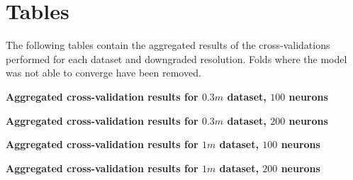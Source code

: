 
\chapter{Tables} 

\label{Tables}

The following tables contain the aggregated results of the cross-validations performed for each dataset and downgraded resolution. Folds where the model was not able to converge have been removed.

\begin{sidewaystable}
    \centering
	
	\captionsetup{width=0.7\linewidth}
	\caption{\textbf{Aggregated cross-validation results for $0.3m$ dataset, $100$ neurons}}
	\label{tab:Results_03m_100n}
\end{sidewaystable}

\begin{sidewaystable}
    \centering
	
	\captionsetup{width=0.7\linewidth}
	\caption{\textbf{Aggregated cross-validation results for $0.3m$ dataset, $200$ neurons}}
	\label{tab:Results_03m_200n}
\end{sidewaystable}

\begin{sidewaystable}
    \centering
	
	\captionsetup{width=0.7\linewidth}
	\caption{\textbf{Aggregated cross-validation results for $1m$ dataset, $100$ neurons}}
	\label{tab:Results_1m_100n}
\end{sidewaystable}

\begin{sidewaystable}
    \centering
	
	\captionsetup{width=0.7\linewidth}
	\caption{\textbf{Aggregated cross-validation results for $1m$ dataset, $200$ neurons}}
	\label{tab:Results_1m_200n}
\end{sidewaystable}
